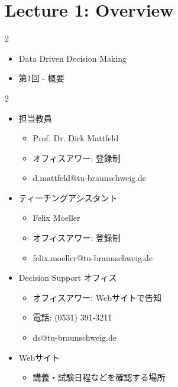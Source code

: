\section*{Lecture 1: Overview}
\clearpage
{}
\begin{multicols}{2}\scriptsize\raggedcolumns
{}
\begin{itemize}
\item Data Driven Decision Making
\item 第1回 - 概要
\end{itemize}
\end{multicols}

\clearpage
{}
\begin{multicols}{2}\scriptsize\raggedcolumns
{}
\begin{itemize}
\item 担当教員
\begin{itemize}
\item Prof. Dr. Dirk Mattfeld
\item オフィスアワー: 登録制
\item d.mattfeld@tu-braunschweig.de
\end{itemize}
\item ティーチングアシスタント
\begin{itemize}
\item Felix Moeller
\item オフィスアワー: 登録制
\item felix.moeller@tu-braunschweig.de
\end{itemize}
\item Decision Support オフィス
\begin{itemize}
\item オフィスアワー: Webサイトで告知
\item 電話: (0531) 391-3211
\item ds@tu-braunschweig.de
\end{itemize}
\item Webサイト
\begin{itemize}
\item 講義・試験日程などを確認する場所
\end{itemize}
\end{itemize}
\end{multicols}

